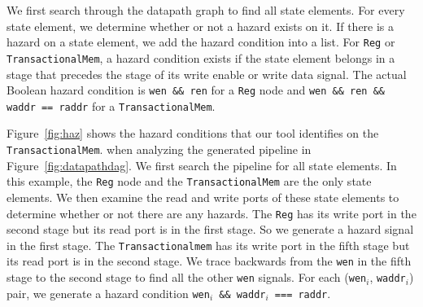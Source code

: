 We first search through the datapath graph to find all state
elements. For every state element, we determine whether or not a
hazard exists on it. If there is a hazard on a state element, we add
the hazard condition into a list. For {\tt Reg} or {\tt TransactionalMem}, a
hazard condition exists if the state element belongs in a stage that precedes the
stage of its write enable or write data signal. The actual Boolean
hazard condition is {\tt wen \&\& ren} for a {\tt Reg} node and
{\tt wen \&\& ren \&\& waddr == raddr} for a {\tt TransactionalMem}.

Figure~\ref{fig:haz} shows the hazard conditions that our tool
identifies on the {\tt TransactionalMem}. when analyzing the generated pipeline in
Figure~\ref{fig:datapathdag}. We first search the pipeline for all
state elements. In this example, the {\tt Reg} node and the 
{\tt TransactionalMem} are the only state elements. We then examine
the read and write ports of these state elements to determine whether
or not there are any hazards. The {\tt Reg} has its write port in the
second stage but its read port is in the first stage. So we generate a
hazard signal in the first stage. The {\tt Transactionalmem} has its
write port in the fifth stage but its read port is in the second
stage. We trace backwards from the {\tt wen} in the fifth stage to the
second stage to find all the other {\tt wen} signals. For each 
({\tt wen}$_i$, {\tt waddr}$_i$) pair, we generate a hazard condition
{\tt wen$_i$ \&\& waddr$_i$ === raddr}.


